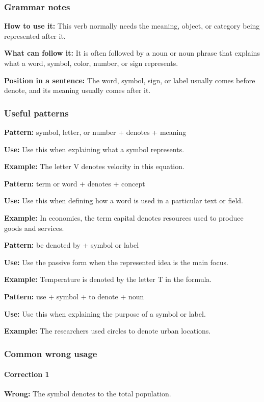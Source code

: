 \documentclass[11pt]{article}
\begin{document}
\subsubsection{Grammar notes}
\textbf{How to use it:} This verb normally needs the meaning, object, or category being represented after it.

\textbf{What can follow it:} It is often followed by a noun or noun phrase that explains what a word, symbol, color, number, or sign represents.

\textbf{Position in a sentence:} The word, symbol, sign, or label usually comes before denote, and its meaning usually comes after it.

\subsubsection{Useful patterns}
\textbf{Pattern:} symbol, letter, or number + denotes + meaning

\textbf{Use:} Use this when explaining what a symbol represents.

\textbf{Example:} The letter V denotes velocity in this equation.

\textbf{Pattern:} term or word + denotes + concept

\textbf{Use:} Use this when defining how a word is used in a particular text or field.

\textbf{Example:} In economics, the term capital denotes resources used to produce goods and services.

\textbf{Pattern:} be denoted by + symbol or label

\textbf{Use:} Use the passive form when the represented idea is the main focus.

\textbf{Example:} Temperature is denoted by the letter T in the formula.

\textbf{Pattern:} use + symbol + to denote + noun

\textbf{Use:} Use this when explaining the purpose of a symbol or label.

\textbf{Example:} The researchers used circles to denote urban locations.

\subsubsection{Common wrong usage}
\paragraph{Correction 1}
\textbf{Wrong:} The symbol denotes to the total population.
\end{document}
